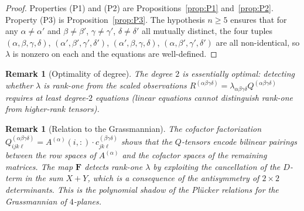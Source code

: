 \documentclass[12pt]{article}
\newtheorem{remark}[theorem]{Remark}
\begin{document}
\begin{proof}
Properties (P1) and (P2) are Propositions~\ref{prop:P1} and~\ref{prop:P2}.
Property (P3) is Proposition~\ref{prop:P3}.
The hypothesis $n\geq 5$ ensures that for any $\alpha\neq\alpha'$ and $\beta\neq\beta'$,
$\gamma\neq\gamma'$, $\delta\neq\delta'$ all mutually distinct, the four tuples
$(\alpha,\beta,\gamma,\delta)$, $(\alpha',\beta',\gamma',\delta')$, $(\alpha',\beta,\gamma,\delta)$,
$(\alpha,\beta',\gamma',\delta')$ are all non-identical, so $\lambda$ is nonzero on each
and the equations are well-defined.
\end{proof}

\begin{remark}[Optimality of degree]
The degree $2$ is essentially optimal: detecting whether $\lambda$ is rank-one from the
scaled observations $R^{(\alpha\beta\gamma\delta)}=\lambda_{\alpha\beta\gamma\delta}Q^{(\alpha\beta\gamma\delta)}$
requires at least degree-$2$ equations (linear equations cannot distinguish rank-one from
higher-rank tensors).
\end{remark}

\begin{remark}[Relation to the Grassmannian]
The cofactor factorization $Q^{(\alpha\beta\gamma\delta)}_{ijk\ell}=A^{(\alpha)}(i,:)\cdot c^{(\beta\gamma\delta)}_{jk\ell}$
shows that the $Q$-tensors encode bilinear pairings between the row spaces of $A^{(\alpha)}$
and the cofactor spaces of the remaining matrices.  The map $\mathbf{F}$ detects rank-one
$\lambda$ by exploiting the cancellation of the $D$-term in the sum $X+Y$, which is
a consequence of the antisymmetry of $2\times2$ determinants.
This is the polynomial shadow of the Pl\"ucker relations for the Grassmannian of $4$-planes.
\end{remark}
\end{document}
